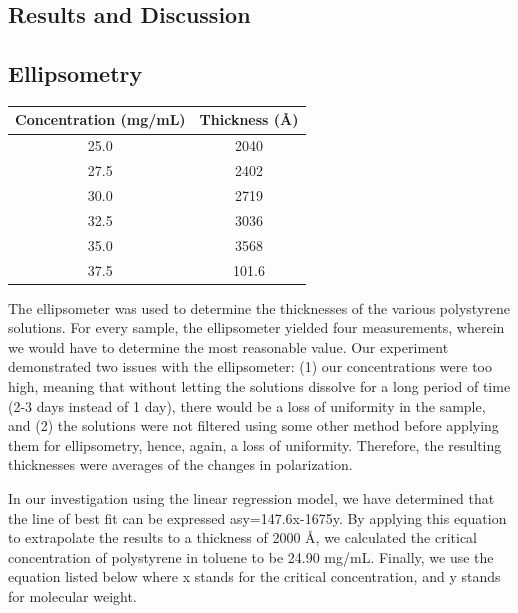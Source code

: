 \documentclass{article}
\newenvironment{Table}
  {\par\medskip\noindent\minipage{\linewidth}}
  {\endminipage\par\medskip}
\begin{document}
\begin{multicols}{2}
        \section{Results and Discussion}
            \subsection{Ellipsometry}

                \begin{Table}
                    \centering
                        \begin{tabular}{@{}cc@{}}
                            \toprule
                            Concentration (mg/mL) & Thickness (Å) \\ \midrule
                            25.0                  & 2040          \\
                            27.5                  & 2402          \\
                            30.0                  & 2719          \\
                            32.5                  & 3036          \\
                            35.0                  & 3568          \\
                            37.5                  & 101.6         \\ \bottomrule
                        \end{tabular}
                \end{Table}

                The ellipsometer was used to determine the thicknesses of the various polystyrene solutions. For every sample, the ellipsometer yielded four measurements, wherein we would have to determine the most reasonable value. Our experiment demonstrated two issues with the ellipsometer: (1) our concentrations were too high, meaning that without letting the solutions dissolve for a long period of time (2-3 days instead of 1 day), there would be a loss of uniformity in the sample, and (2) the solutions were not filtered using some other method before applying them for ellipsometry, hence, again, a loss of uniformity. Therefore, the resulting thicknesses were averages of the changes in polarization.

                In our investigation using the linear regression model, we have determined that the line of best fit can be expressed asy=147.6x-1675y. By applying this equation to extrapolate the results to a thickness of 2000 Å, we calculated the critical concentration of polystyrene in toluene to be 24.90 mg/mL. Finally, we use the equation listed below where x stands for the critical concentration, and y stands for molecular weight.


\end{multicols}
\end{document}
